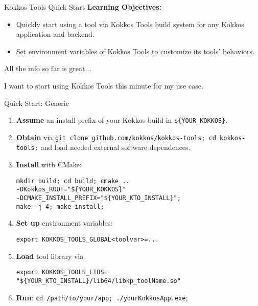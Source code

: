 \begin{frame}{Kokkos Tools Quick Start}
\textbf{Learning Objectives:} 

\begin{itemize}
\item Quickly start using a tool via Kokkos Tools build system for any Kokkos application and backend.
\item Set environment variables of Kokkos Tools to customize its tools' behaviors.
\end{itemize}
\end{frame}


\begin{frame}{All the info so far is great...}
\begin{center}
I want to start using Kokkos Tools this minute for my use case. 
\end{center}
\end{frame}

\begin{frame}[fragile]{Quick Start: Generic}
\begin{enumerate}
\small 
\item \textbf{Assume} an install prefix of your Kokkos build in \texttt{\$\{YOUR\_KOKKOS\}}.
\item \textbf{Obtain} via \texttt{git clone github.com/kokkos/kokkos-tools; cd kokkos-tools;} and load needed external software dependences.
\item \textbf{Install} with CMake:
\begin{lstlisting}
mkdir build; cd build; cmake ..
-DKokkos_ROOT="${YOUR_KOKKOS}"
-DCMAKE_INSTALL_PREFIX="${YOUR_KTO_INSTALL}";
make -j 4; make install;
\end{lstlisting}

\item \textbf{Set up} environment variables:
\begin{lstlisting}
export KOKKOS_TOOLS_GLOBAL<toolvar>=...
\end{lstlisting}
\item \textbf{Load} tool library via
\begin{lstlisting}
export KOKKOS_TOOLS_LIBS=
"${YOUR_KTO_INSTALL}/lib64/libkp_toolName.so"
\end{lstlisting}

\item \textbf{Run}: \texttt{cd /path/to/your/app; ./yourKokkosApp.exe};
\end{enumerate}

\end{frame}

